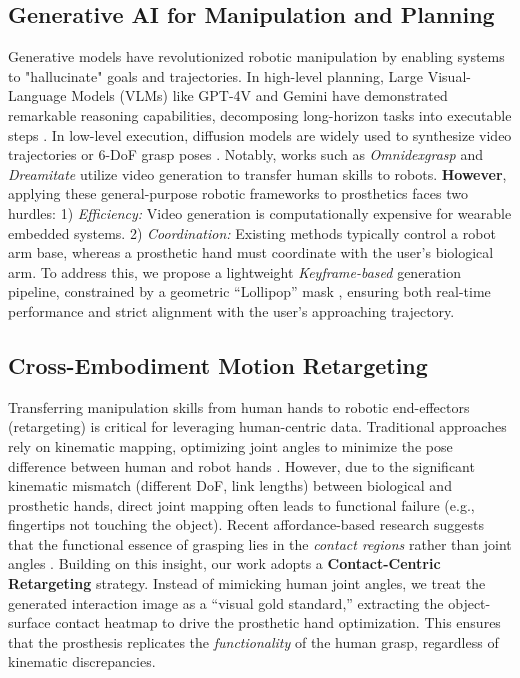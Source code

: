\documentclass[letterpaper, 10 pt, conference]{ieeeconf}  %
\begin{document}
\subsection{Generative AI for Manipulation and Planning}
Generative models have revolutionized robotic manipulation by enabling systems to "hallucinate" goals and trajectories. 
In high-level planning, Large Visual-Language Models (VLMs) like GPT-4V and Gemini have demonstrated remarkable reasoning capabilities, decomposing long-horizon tasks into executable steps \cite{wu2025qwen, wan2025wan, vlm_planning_1}. 
In low-level execution, diffusion models \cite{rombach2022high, wu2025qwen} are widely used to synthesize video trajectories \cite{jang2025dreamgen, li2025manipdreamer} or 6-DoF grasp poses \cite{grasp_gen_1}.
Notably, works such as \textit{Omnidexgrasp} \cite{wei2025omnidexgrasp} and \textit{Dreamitate} \cite{liang2024dreamitate} utilize video generation to transfer human skills to robots.
\textbf{However}, applying these general-purpose robotic frameworks to prosthetics faces two hurdles: 
1) \textit{Efficiency:} Video generation is computationally expensive for wearable embedded systems.
2) \textit{Coordination:} Existing methods typically control a robot arm base, whereas a prosthetic hand must coordinate with the user's biological arm. 
To address this, we propose a lightweight \textit{Keyframe-based} generation pipeline, constrained by a geometric ``Lollipop'' mask \cite{ye2023affordance, wang2023robogen}, ensuring both real-time performance and strict alignment with the user's approaching trajectory.

\subsection{Cross-Embodiment Motion Retargeting}
Transferring manipulation skills from human hands to robotic end-effectors (retargeting) is critical for leveraging human-centric data. 
Traditional approaches rely on kinematic mapping, optimizing joint angles to minimize the pose difference between human and robot hands \cite{salter2024emg2pose}. However, due to the significant kinematic mismatch (different DoF, link lengths) between biological and prosthetic hands, direct joint mapping often leads to functional failure (e.g., fingertips not touching the object).
Recent affordance-based research suggests that the functional essence of grasping lies in the \textit{contact regions} rather than joint angles \cite{cai2016understanding, ye2023affordance}. 
Building on this insight, our work adopts a \textbf{Contact-Centric Retargeting} strategy. Instead of mimicking human joint angles, we treat the generated interaction image as a ``visual gold standard,'' extracting the object-surface contact heatmap to drive the prosthetic hand optimization. This ensures that the prosthesis replicates the \textit{functionality} of the human grasp, regardless of kinematic discrepancies.
\end{document}
